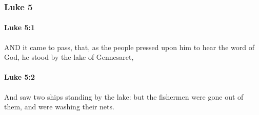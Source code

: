 	\subsubsection{Luke 5} %
		\label{LUKE-5}
		
		\paragraph{Luke 5:1} %
			\label{LUKE-5-1}

			AND it came to pass, that, as the people pressed upon him to hear the word of God, he stood by the lake of Gennesaret,

			\begin{framed}
			\scriptsize
				\begin{compactdesc}
					\item[SBLG] 
				\end{compactdesc}
			\end{framed}

		\paragraph{Luke 5:2} %
			\label{LUKE-5-2}

			And saw two ships standing by the lake: but the fishermen were gone out of them, and were washing their nets.

